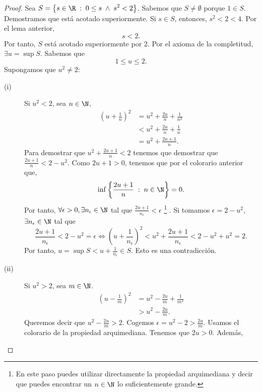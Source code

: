 \begin{proof}
Sea $\displaystyle S = \left\{ s \in \R \; : \; 0 \leq s \; \land \; s^{2} < 2 \right\}  $. Sabemos que $\displaystyle S \neq \emptyset $  porque $\displaystyle 1 \in S $. Demostramos que está acotado superiormente. Si $\displaystyle s \in S $, entonces, $\displaystyle s^{2} < 2 < 4 $. Por el lema anterior, 
\[s < 2 .\]
Por tanto, $\displaystyle S $ está acotado superiormente por $\displaystyle 2 $. Por el axioma de la completitud, $\displaystyle \exists u = \sup S $. Sabemos que 
\[1 \leq u \leq 2 .\]
Supongamos que $\displaystyle u^{2} \neq 2 $:
\begin{description}
\item[(i)] Si $\displaystyle u^{2} < 2 $, sea $\displaystyle n \in \N $, 
	\[
	\begin{split}
		\left(u + \frac{1}{n}\right)^{2} & = u^{2} + \frac{2u}{n} + \frac{1}{n^{2}} \\
						 & < u^{2} + \frac{2u}{n} + \frac{1}{n} \\
						 & = u^{2} + \frac{2u + 1}{n}.
	\end{split}
	\]
Para demostrar que $\displaystyle u^{2} + \frac{2u +1}{n} <2 $ tenemos que demostrar que $\displaystyle \frac{2u+1}{n} < 2 - u^{2} $. Como $\displaystyle 2u+1 > 0 $, tenemos que por el colorario anterior que, 
\[ \inf \left\{ \frac{2u+1}{n}\; : \; n \in \N\right\} = 0 .\]
Por tanto, $\displaystyle \forall \epsilon > 0, \exists n_{\epsilon } \in \N $ tal que $\displaystyle \frac{2u + 1}{n_{\epsilon }} < \epsilon  $ \footnote{En este paso puedes utilizar directamente la propiedad arquimediana y decir que puedes encontrar un $\displaystyle n\in\N $ lo suficientemente grande.} . Si tomamos $\displaystyle \epsilon = 2 - u^{2} $, $\displaystyle \exists n_{\epsilon } \in \N $ tal que 
\[\frac{2u+1}{n_{\epsilon }}  < 2 - u^{2}= \epsilon \iff \left(u + \frac{1}{n_{\epsilon }}\right)^{2} < u^{2} + \frac{2u+1}{n_{\epsilon }} < 2 - u^{2} + u^{2} = 2 .\]
Por tanto, $\displaystyle u = \sup S < u + \frac{1}{n_{\epsilon }} \in S $. Esto es una contradicción. 
\item[(ii)] Si $\displaystyle u^{2} > 2 $, sea $\displaystyle m \in \N $. 
\[
\begin{split}
	\left(u - \frac{1}{m}\right)^{2} & = u^{2} - \frac{2u}{m} + \frac{1}{m^{2}} \\
					 & > u^{2} - \frac{2u}{m}.
\end{split}
\]
Queremos decir que $\displaystyle u^{2} - \frac{2u}{m} > 2 $. Cogemos $\displaystyle \epsilon = u^{2}-2 > \frac{2u}{m} $. Usamos el colorario de la propiedad arquimediana. Tenemos que $\displaystyle 2u > 0 $. Además, 

\end{description}
\end{proof}
